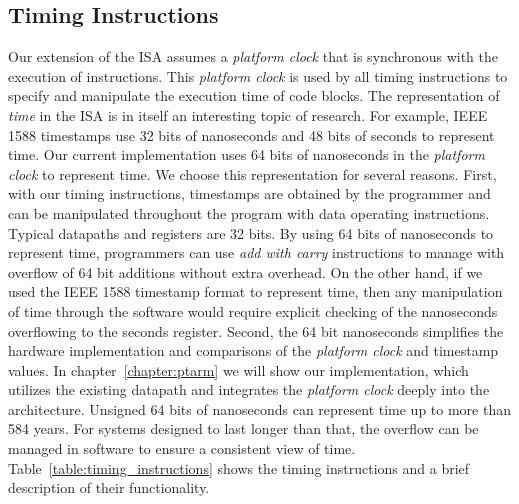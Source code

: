 \subsection{Timing Instructions}
Our extension of the ISA assumes a \emph{platform clock} that is synchronous with the execution of instructions.
This \emph{platform clock} is used by all timing instructions to specify and manipulate the execution time of code blocks.
The representation of \emph{time} in the ISA is in itself an interesting topic of research.
For example, IEEE 1588 timestamps use 32 bits of nanoseconds and 48 bits of seconds to represent time.    
Our current implementation uses 64 bits of nanoseconds in the \emph{platform clock} to represent time. 
We choose this representation for several reasons. 
First, with our timing instructions, timestamps are obtained by the programmer and can be manipulated throughout the program with data operating instructions.
Typical datapaths and registers are 32 bits. 
By using 64 bits of nanoseconds to represent time, programmers can use \emph{add with carry} instructions to manage with overflow of 64 bit additions without extra overhead. 
On the other hand, if we used the IEEE 1588 timestamp format to represent time, then any manipulation of time through the software would require explicit checking of the nanoseconds overflowing to the seconds register.
Second, the 64 bit nanoseconds simplifies the hardware implementation and comparisons of the \emph{platform clock} and timestamp values.
In chapter~\ref{chapter:ptarm} we will show our implementation, which utilizes the existing datapath and integrates the \emph{platform clock} deeply into the architecture.   
Unsigned 64 bits of nanoseconds can represent time up to more than 584 years. 
For systems designed to last longer than that, the overflow can be managed in software to ensure a consistent view of time.
Table~\ref{table:timing_instructions} shows the timing instructions and a brief description of their functionality.   

